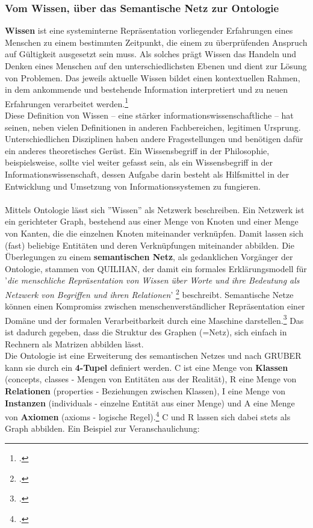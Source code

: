 \documentclass[12pt,a4paper]{article}
\begin{document}
\subsubsection{Vom Wissen, über das Semantische Netz zur Ontologie}
\textbf{Wissen} ist eine systeminterne Repräsentation vorliegender Erfahrungen eines Menschen zu einem bestimmten Zeitpunkt, die einem zu überprüfenden Anspruch auf Gültigkeit ausgesetzt sein muss. Als solches prägt Wissen das Handeln und Denken eines Menschen auf den unterschiedlichsten Ebenen und dient zur Lösung von Problemen. Das jeweils aktuelle Wissen bildet einen kontextuellen Rahmen, in dem ankommende und bestehende Information interpretiert und zu neuen Erfahrungen verarbeitet werden.\footcite{favre2001information}
\\
Diese Definition von Wissen -- eine stärker informationswissenschaftliche -- hat seinen, neben vielen Definitionen in anderen Fachbereichen, legitimen Ursprung.  Unterschiedlichen Disziplinen haben andere Fragestellungen und benötigen dafür ein anderes theoretisches Gerüst. Ein Wissensbegriff in der Philosophie, beispielsweise, sollte viel weiter gefasst sein, als ein Wissensbegriff in der Informationswissenschaft, dessen Aufgabe darin besteht als Hilfsmittel in der Entwicklung und Umsetzung von Informationssystemen zu fungieren. 
\\
\\
Mittels Ontologie lässt sich ''Wissen'' als Netzwerk beschreiben. Ein Netzwerk ist ein gerichteter Graph, bestehend aus einer Menge von Knoten und einer Menge von Kanten, die die einzelnen Knoten miteinander verknüpfen. Damit lassen sich (fast) beliebige Entitäten und deren Verknüpfungen miteinander abbilden. Die Überlegungen zu einem \textbf{semantischen Netz}, als gedanklichen Vorgänger der Ontologie, stammen von QUILIIAN, der damit ein formales Erklärungsmodell für '\textit{die menschliche Repräsentation von Wissen über Worte und ihre Bedeutung als Netzwerk von Begriffen und ihren Relationen}' \footcite{stuckenschmidt2009ontologien} beschreibt. Semantische Netze können einen Kompromiss zwischen menschenverständlicher Repräsentation einer Domäne  und der formalen Verarbeitbarkeit durch eine Maschine darstellen.\footcite{reichenberger2010grundlagen} Das ist dadurch gegeben, dass die Struktur des Graphen (=Netz), sich einfach in Rechnern als Matrizen abbilden lässt.
\\
Die Ontologie ist eine Erweiterung des semantischen Netzes und nach GRUBER kann sie durch ein \textbf{4-Tupel} definiert werden. C ist eine Menge von \textbf{Klassen} (concepts, classes - Mengen von Entitäten aus der Realität), R eine Menge von \textbf{Relationen} (properties - Beziehungen zwischen Klassen), I eine Menge von \textbf{Instanzen} (individuals - einzelne Entität aus einer Menge) und A eine Menge von \textbf{Axiomen} (axioms - logische Regel).\footcite{joostbreukera2009flood} C und R lassen sich dabei stets als Graph abbilden. Ein Beispiel zur Veranschaulichung: 
\end{document}

